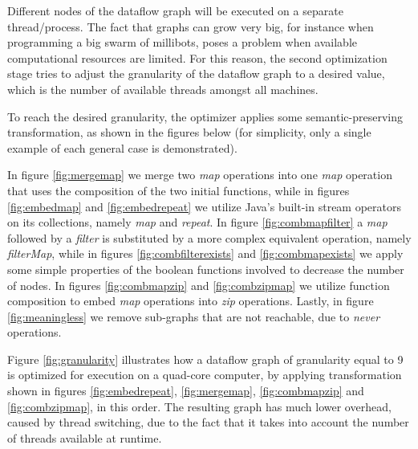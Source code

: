 \documentclass{dithesis}
\begin{document}

Different nodes of the dataflow graph will be executed on a separate thread/process. The fact that graphs can grow very big, for instance when programming a big swarm of millibots\cite{army}, poses a problem when available computational resources are limited. For this reason, the second optimization stage tries to adjust the granularity of the dataflow graph to a desired value, which is the number of available threads amongst all machines. 


To reach the desired granularity, the optimizer applies some semantic-preserving transformation, as shown in the figures below (for simplicity, only a single example of each general case is demonstrated). 


\newpage
In figure \ref{fig:mergemap} we merge two \textit{map} operations into one \textit{map} operation that uses the composition of the two initial functions, while in figures \ref{fig:embedmap} and \ref{fig:embedrepeat} we utilize Java's built-in stream operators on its collections, namely \textit{map} and \textit{repeat}. In figure \ref{fig:combmapfilter} a \textit{map} followed by a \textit{filter} is substituted by a more complex equivalent operation, namely \textit{filterMap}, while in figures \ref{fig:combfilterexists} and \ref{fig:combmapexists} we apply some simple properties of the boolean functions involved to decrease the number of nodes. In figures \ref{fig:combmapzip} and \ref{fig:combzipmap} we utilize function composition to embed \textit{map} operations into \textit{zip} operations. Lastly, in figure \ref{fig:meaningless} we remove sub-graphs that are not reachable, due to \textit{never} operations.


Figure \ref{fig:granularity} illustrates how a dataflow graph of granularity equal to 9 is optimized for execution on a quad-core computer, by applying transformation shown in figures \ref{fig:embedrepeat}, \ref{fig:mergemap}, \ref{fig:combmapzip} and \ref{fig:combzipmap}, in this order. The resulting graph has much lower overhead, caused by thread switching, due to the fact that it takes into account the number of threads available at runtime.
\end{document}
